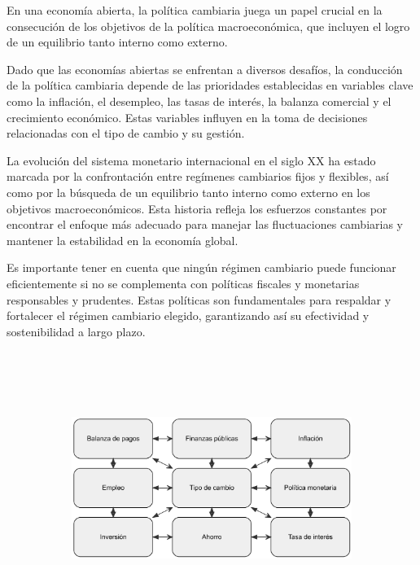 \documentclass[
  letterpaper,
  DIV=11,
  numbers=noendperiod]{scrartcl}
\begin{document}
En una economía abierta, la política cambiaria juega un papel crucial en
la consecución de los objetivos de la política macroeconómica, que
incluyen el logro de un equilibrio tanto interno como externo.

Dado que las economías abiertas se enfrentan a diversos desafíos, la
conducción de la política cambiaria depende de las prioridades
establecidas en variables clave como la inflación, el desempleo, las
tasas de interés, la balanza comercial y el crecimiento económico. Estas
variables influyen en la toma de decisiones relacionadas con el tipo de
cambio y su gestión.

La evolución del sistema monetario internacional en el siglo XX ha
estado marcada por la confrontación entre regímenes cambiarios fijos y
flexibles, así como por la búsqueda de un equilibrio tanto interno como
externo en los objetivos macroeconómicos. Esta historia refleja los
esfuerzos constantes por encontrar el enfoque más adecuado para manejar
las fluctuaciones cambiarias y mantener la estabilidad en la economía
global.

Es importante tener en cuenta que ningún régimen cambiario puede
funcionar eficientemente si no se complementa con políticas fiscales y
monetarias responsables y prudentes. Estas políticas son fundamentales
para respaldar y fortalecer el régimen cambiario elegido, garantizando
así su efectividad y sostenibilidad a largo plazo.

\begin{figure}

\caption{\label{fig-2}Interrelaciones entre tipo de cambio, variables y
políticas económicas}

{\centering 

\begin{figure}[H]

{\centering \includegraphics[width=5.5in,height=3.5in]{index_files/figure-latex/dot-figure-2.png}

}

\end{figure}

}

\end{figure}
\end{document}

